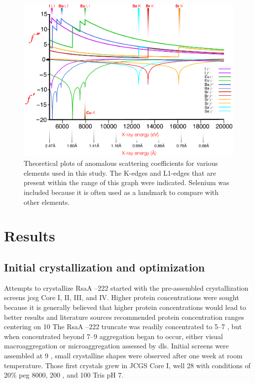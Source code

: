 \begin{figure}[htb]
  	\begin{center}
   		\includegraphics[width=\textwidth]{crystal_chapter/img/edgeplots.pdf}
   	\end{center}
   	\caption[Edge plots for useful anomalous dispersion elements]{
   	Theoretical plots of anomalous scattering coefficients for various elements used in this study. The K-edges and L1-edges that are present within the range of this graph were indicated. Selenium was included because it is often used as a landmark to compare with other elements.}
   	\label{fig:edges}
\end{figure}    

\section{Results}\label{sec:crystal-results}

\subsection{Initial crystallization and optimization}\label{sec:init-cryst-optim} 
 Attempts to crystallize RsaA --222 started with the pre-assembled crystallization screens \ac{jcsg} Core I, II, III, and IV. Higher protein concentrations were sought because it is generally believed that higher protein concentrations would lead to better results and literature sources recommended protein concentration ranges centering on 10 \mgperml{}  The RsaA --222 truncate was readily concentrated to 5--7 \mgperml, but when concentrated beyond 7--9 \mgperml aggregation began to occur, either visual macroaggregation or microaggregation assessed by \ac{dls}. Initial screens were assembled at 9 \mgperml, small crystalline shapes were observed after one week at room temperature. Those first crystals grew in JCGS Core I, well 28 with conditions of 20\% \ac{peg} 8000, 200 \millimolar {}, and 100 \millimolar Tris pH 7.
 
